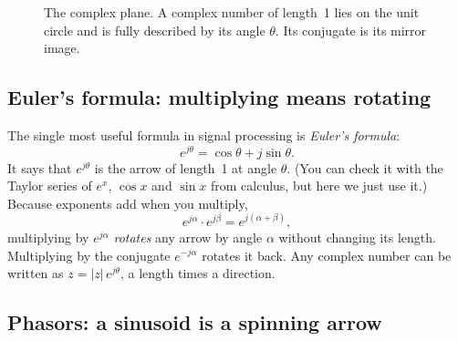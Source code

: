 \documentclass[11pt]{article}
\begin{document}
\begin{figure}[ht]
\centering
{}
\caption{The complex plane. A complex number of length~1 lies on the unit circle and is fully
described by its angle $\theta$. Its conjugate is its mirror image.}
\label{fig:complexplane}
\end{figure}

\subsection{Euler's formula: multiplying means rotating}

The single most useful formula in signal processing is \emph{Euler's formula}:
\begin{equation}\label{eq:euler}
  e^{j\theta}=\cos\theta+j\sin\theta.
\end{equation}
It says that $e^{j\theta}$ is the arrow of length~1 at angle $\theta$. (You can check it with the
Taylor series of $e^x$, $\cos x$ and $\sin x$ from calculus, but here we just use it.) Because
exponents add when you multiply,
\begin{equation}\label{eq:rotate}
  e^{j\alpha}\cdot e^{j\beta}=e^{j(\alpha+\beta)},
\end{equation}
multiplying by $e^{j\alpha}$ \emph{rotates} any arrow by angle $\alpha$ without changing its
length. Multiplying by the conjugate $e^{-j\alpha}$ rotates it back. Any complex number can be
written as $z=|z|\,e^{j\theta}$, a length times a direction.

\subsection{Phasors: a sinusoid is a spinning arrow}
\end{document}
